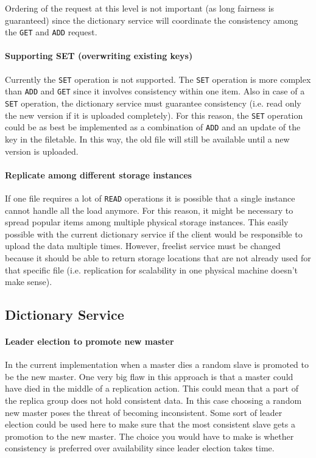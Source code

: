 \documentclass[12pt,a4paper]{scrartcl}
\begin{document}
Ordering of the request at this level is not important (as long fairness is guaranteed) since the dictionary service will coordinate the consistency among the \verb|GET| and \verb|ADD| request.

\paragraph{Supporting SET (overwriting existing keys)}
Currently the \verb|SET| operation is not supported. The \verb|SET| operation is more complex than \verb|ADD| and \verb|GET| since it involves consistency within one item. Also in case of a \verb|SET| operation, the dictionary service must guarantee consistency (i.e. read only the new version if it is uploaded completely). For this reason, the \verb|SET| operation could be as best be implemented as a combination of \verb|ADD| and an update of the key in the filetable. In this way, the old file will still be available until a new version is uploaded.

\paragraph{Replicate among different storage instances}
If one file requires a lot of \verb|READ| operations it is possible that a single instance cannot handle all the load anymore. For this reason, it might be necessary to spread popular items among multiple physical storage instances. This easily possible with the current dictionary service if the client would be responsible to upload the data multiple times. However, freelist service must be changed because it should be able to return storage locations that are not already used for that specific file (i.e. replication for scalability in one physical machine doesn't make sense).

\subsection{Dictionary Service}

\paragraph{Leader election to promote new master}
In the current implementation when a master dies a random slave is promoted to be the new master. One very big flaw in this approach is that a master could have died in the middle of a replication action. This could mean that a part of the replica group does not hold consistent data. In this case choosing a random new master poses the threat of becoming inconsistent. Some sort of leader election could be used here to make sure that the most consistent slave gets a promotion to the new master. The choice you would have to make is whether consistency is preferred over availability since leader election takes time.
\end{document}
